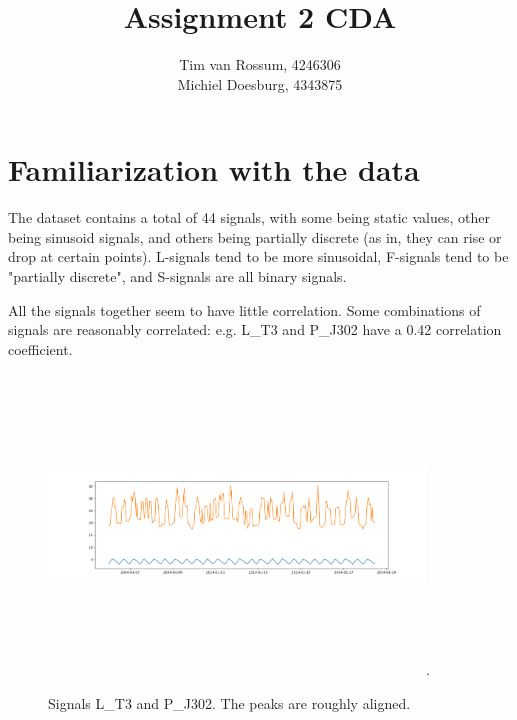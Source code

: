 \documentclass[]{article}
\title{Assignment 2 CDA}
\author{Tim van Rossum, 4246306\\
	Michiel Doesburg, 4343875}
\begin{document}
\maketitle
\section{Familiarization with the data}
The dataset contains a total of 44 signals, with some being static values, other being sinusoid signals, and others being partially discrete (as in, they can rise or drop at certain points). L-signals tend to be more sinusoidal, F-signals tend to be "partially discrete", and S-signals are all binary signals.

All the signals together seem to have little correlation. Some combinations of signals are reasonably correlated: e.g. L\_T3 and P\_J302 have a 0.42 correlation coefficient. 

\begin{figure}

\includegraphics[width=10cm,height=8cm]{./visuallizations/correlated_signals.png}.
\caption{Signals L\_T3 and P\_J302. The peaks are roughly aligned.}
\end{figure}
\end{document}
